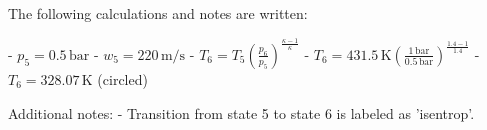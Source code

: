 The following calculations and notes are written:  

- \( p_5 = 0.5 \, \text{bar} \)  
- \( w_5 = 220 \, \text{m/s} \)  
- \( T_6 = T_5 \left( \frac{p_6}{p_5} \right)^{\frac{\kappa - 1}{\kappa}} \)  
- \( T_6 = 431.5 \, \text{K} \left( \frac{1 \, \text{bar}}{0.5 \, \text{bar}} \right)^{\frac{1.4 - 1}{1.4}} \)  
- \( T_6 = 328.07 \, \text{K} \) (circled)  

Additional notes:  
- Transition from state 5 to state 6 is labeled as 'isentrop'.